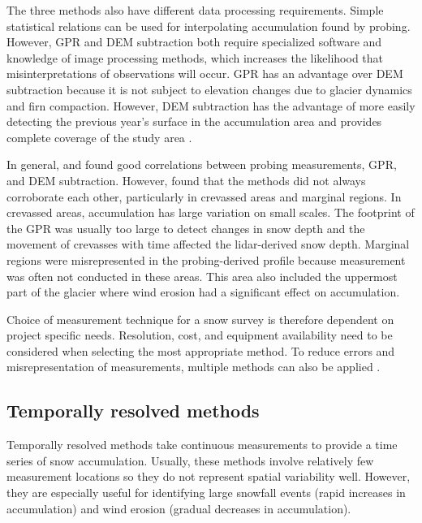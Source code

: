 \documentclass{sfuthesis}
\begin{document}
The three methods also have different data processing requirements. Simple statistical relations can be used for interpolating accumulation found by probing. However, GPR and DEM subtraction both require specialized software and knowledge of image processing methods, which increases the likelihood that misinterpretations of observations will occur. GPR has an advantage over DEM subtraction because it is not subject to elevation changes due to glacier dynamics and firn compaction. However, DEM subtraction has the advantage of more easily detecting the previous year's surface in the accumulation area and provides complete coverage of the study area \citep{Sold2013}. 

In general, \cite{Machguth2006} and \cite{Sold2013} found good correlations between probing measurements, GPR, and DEM subtraction. However, \citep{Sold2013} found that the methods did not always corroborate each other, particularly in crevassed areas and marginal regions. In crevassed areas, accumulation has large variation on small scales. The footprint of the GPR was usually too large to detect changes in snow depth and the movement of crevasses with time affected the lidar-derived snow depth. Marginal regions were misrepresented in the probing-derived profile because measurement was often not conducted in these areas. This area also included the uppermost part of the glacier where wind erosion had a significant effect on accumulation. 

Choice of measurement technique for a snow survey is therefore dependent on project specific needs. Resolution, cost, and equipment availability need to be considered when selecting the most appropriate method. To reduce errors and misrepresentation of measurements, multiple methods can also be applied \citep{Machguth2006}. 

\subsection{Temporally resolved methods}
Temporally resolved methods take continuous measurements to provide a time series of snow accumulation. Usually, these methods involve relatively few measurement locations so they do not represent spatial variability well. However, they are especially useful for identifying large snowfall events (rapid increases in accumulation) and wind erosion (gradual decreases in accumulation). 
\end{document}
